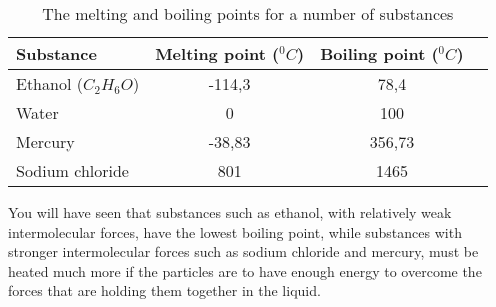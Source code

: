 \begin{enumerate}
\begin{table}[h]
\begin{center}
\begin{tabular}{|l|c|c|c|}\hline
\textbf{Substance} & \textbf{Melting point ($^{0}C$)} & \textbf{Boiling point ($^{0}C$)}\\\hline
Ethanol ($C_{2}H_{6}O$) & -114,3 & 78,4 \\\hline
Water & 0 & 100 \\\hline
Mercury & -38,83 & 356,73 \\\hline
Sodium chloride & 801 & 1465 \\\hline
\end{tabular}
\end{center}
\caption{The melting and boiling points for a number of substances}
\label{tab:melt and boil} 
\end{table}

You will have seen that substances such as ethanol, with relatively weak intermolecular forces, have the lowest boiling point, while substances with stronger intermolecular forces such as sodium chloride and mercury, must be heated much more if the particles are to have enough energy to overcome the forces that are holding them together in the liquid.

\end{enumerate}
